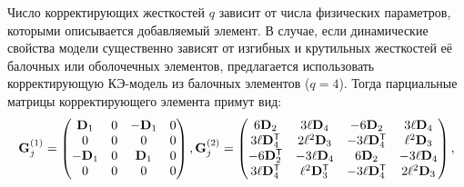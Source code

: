Число корректирующих жесткостей $ q $ зависит от числа физических параметров, которыми описывается добавляемый элемент. В случае, если динамические свойства модели существенно зависят от изгибных и крутильных жесткостей её балочных или оболочечных элементов, предлагается использовать корректирующую КЭ-модель из балочных элементов ($ q = 4 $). Тогда парциальные матрицы корректирующего элемента примут вид:
\begin{equation*}
	\mathbf{G}_j^{(1)} =
	\begin{pmatrix}
		\mathbf{D}_1 & 0 & -\mathbf{D}_1 & 0 \\
		0 & 0 & 0 & 0 \\
		-\mathbf{D}_1 & 0 & \mathbf{D}_1 & 0 \\
		0 & 0 & 0 & 0 \\
	\end{pmatrix},
	\mathbf{G}_j^{(2)} =
	\begin{pmatrix}
		6 \mathbf{D}_2 & 3 \ell \mathbf{D}_4 & -6 \mathbf{D}_2 & 3 \ell \mathbf{D}_4 \\
		3 \ell \mathbf{D} ^ \mathsf{T}_4 & 2 \ell ^ 2 \mathbf{D}_3 & -3 \ell \mathbf{D} ^ \mathsf{T}_4 & \ell ^ 2 \mathbf{D}_3 \\
		-6 \mathbf{D} ^ \mathsf{T}_2 & -3 \ell \mathbf{D}_4 & 6 \mathbf{D}_2 & -3 \ell \mathbf{D}_4 \\
		3 \ell \mathbf{D} ^ \mathsf{T}_4 & \ell ^ 2 \mathbf{D} ^ \mathsf{T}_3 & -3 \ell \mathbf{D} ^ \mathsf{T}_4 & 2 \ell ^ 2 \mathbf{D}_3
	\end{pmatrix},
\end{equation*}

